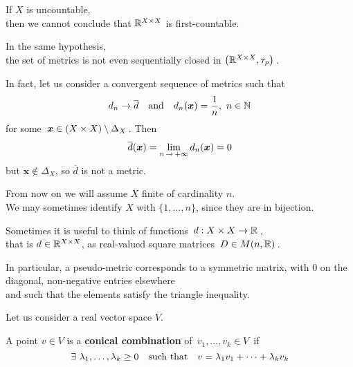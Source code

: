 \documentclass[./main.tex]{subfiles}
\begin{document}
\begin{remark}
    If $X$ is uncountable, \\
    \bsp then we cannot conclude that $\mathbb{R}^{X \times X}$ is first-countable.
\end{remark}

\begin{remark}
    In the same hypothesis, \\
    \bsp the set of metrics is not even sequentially closed in $\bigl( \mathbb{R}^{X \times X}, \tau_p \bigr) \,$.\bigskip
    
    In fact, let us consider a convergent sequence of metrics such that
    \[ d_n \to \overline{d} \quad \text{and} \quad d_n(\bm{x}) = \frac{1}{n},\ n \in \mathbb{N} \]
    for some $\, \bm{x} \in ({X \times X}) \setminus \Delta_X \,$. Then
    \[ \overline{d}(\bm{x}) = \lim_{n \,\to\, + \infty} d_n(\bm{x}) = 0 \eqspace{2pt}{0pt} \]
    but $\bm{x} \notin \Delta_X$, so $\overline{d}$ is not a metric.
\end{remark}

\vspace{\baselineskip} \Hrule

From now on we will assume $X$ finite of cardinality $n$. \\[2pt]
We may sometimes identify $X$ with $\{ 1, \dots, n \}$, since they are in bijection.

\begin{remark}
    Sometimes it is useful to think of functions $\, d : {X \times X} \to \mathbb{R} \,$, \\
    that is $d \in \mathbb{R}^{X \times X}$, as real-valued square matrices $\, D \in M(n,\mathbb{R}) \,$.
    
    In particular, a pseudo-metric corresponds to a symmetric matrix, with 0 on the diagonal, non-negative entries elsewhere \\
    and such that the elements satisfy the triangle inequality.
\end{remark}

\clearpage


Let us consider a real vector space $V$.

\begin{definition}
    A point $v \in V$ is a \textbf{conical combination} of $\, v_1, \dots, v_k \in V \,$ if
    \[ \exists\ \lambda_1, \dots, \lambda_k \geq 0 \quad \text{such that} \quad v = \lambda_1 v_1 + \dots + \lambda_k v_k \nospblw \]
\end{definition}
\end{document}
